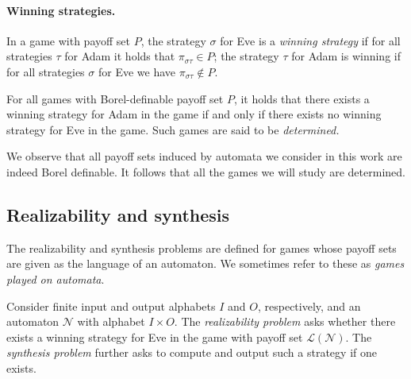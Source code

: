 \documentclass[runningheads,a4paper,draft]{llncs}
\newcommand{\eve}{Eve\xspace}
\newcommand{\adam}{Adam\xspace}
\newcommand{\calN}{\mathcal{N}}
\renewcommand{\lang}[1]{\mathcal{L}({#1})}
\newcommand{\out}[2]{\pi_{#1#2}}
\begin{document}
\paragraph*{Winning strategies.}
In a game with payoff set $P$, the strategy $\sigma$ for \eve is a \emph{winning
strategy} if for all strategies $\tau$ for \adam it holds that
$\out{\sigma}{\tau} \in P$; the strategy $\tau$ for \adam is winning if for all
strategies $\sigma$ for \eve we have $\out{\sigma}{\tau} \not\in P$.

\begin{proposition}
  For all games with Borel-definable payoff set $P$, it holds that there
  exists a winning strategy for \adam in the game if and only if there exists
  no winning strategy for \eve in the game.  Such games are said to be \emph{determined.}
\end{proposition}
We observe that all payoff sets induced by automata we consider in this work
are indeed Borel definable. It follows that all the games we will study are
determined.

\subsection{Realizability and synthesis}
The realizability and synthesis problems are defined for games whose payoff sets
are given as the language of an automaton. We sometimes refer to these as
\emph{games played on automata}.
\begin{definition}[Problems]
  Consider finite input and output alphabets $I$ and $O$, respectively, and
  an automaton $\calN$ with alphabet $I \times O$.
  The \emph{realizability problem} asks whether
  there exists a winning strategy for \eve in the game with payoff set 
  $\lang{\calN}$. The \emph{synthesis problem}
  further asks to compute and output such a strategy if one exists.
\end{definition}
\end{document}
